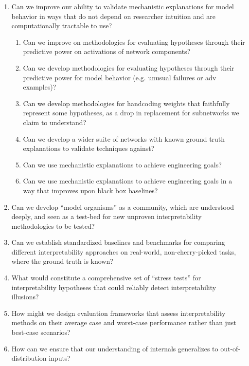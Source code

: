 \begin{enumerate}
    \item Can we improve our ability to validate mechanistic explanations for model behavior in ways that do not depend on researcher intuition and are computationally tractable to use?
    \begin{enumerate}[label=\alph*.]
        \item Can we improve on methodologies for evaluating hypotheses through their predictive power on activations of network components?
        \item Can we develop methodologies for evaluating hypotheses through their predictive power for model behavior (e.g. unusual failures or adv examples)?
        \item Can we develop methodologies for handcoding weights that faithfully represent some hypotheses, as a drop in replacement for subnetworks we claim to understand?
        \item Can we develop a wider suite of networks with known ground truth explanations to validate techniques against?
        \item Can we use mechanistic explanations to achieve engineering goals?
        \item Can we use mechanistic explanations to achieve engineering goals in a way that improves upon black box baselines?
    \end{enumerate}
    
    \item Can we develop “model organisms” as a community, which are understood deeply, and seen as a test-bed for new unproven interpretability methodologies to be tested?
    
    \item Can we establish standardized baselines and benchmarks for comparing different interpretability approaches on real-world, non-cherry-picked tasks, where the ground truth is known?
    
    \item What would constitute a comprehensive set of “stress tests” for interpretability hypotheses that could reliably detect interpretability illusions?
    
    \item How might we design evaluation frameworks that assess interpretability methods on their average case and worst-case performance rather than just best-case scenarios?
    
    \item How can we ensure that our understanding of internals generalizes to out-of-distribution inputs?
\end{enumerate}

